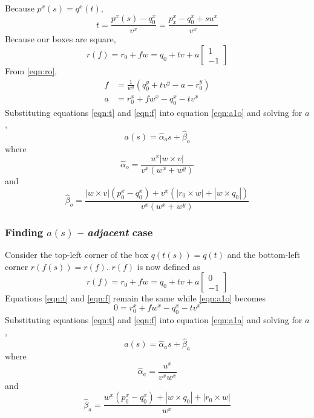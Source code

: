 \documentclass[submission]{gmp2017}
\begin{document}
Because $p^x(s)=q^x(t)$,
\begin{equation}
t = \frac{p^x(s)-q_0^x}{v^x} = \frac{p_x^x-q_0^x+su^x}{v^x} \label{eqn:t}
\end{equation}
Because our boxes are square,
\begin{equation}
r(f) = r_0+fw = q_0+tv+a\begin{bmatrix}1\\-1\end{bmatrix} \label{eqn:ro}
\end{equation}
From \eqref{eqn:ro},
\begin{align}
f &= \frac{1}{w^y}(q_0^y+tv^y-a-r_0^y) \label{eqn:f} \\
a &= r_0^x+fw^x-q_0^x-tv^x \label{eqn:a1o}
\end{align}
Substituting equations \eqref{eqn:t} and \eqref{eqn:f} into equation \eqref{eqn:a1o} and solving for $a$,
\begin{equation}
a(s) = \hat{\alpha}_o s + \hat{\beta}_o \label{eqn:ao}
\end{equation}
where
\begin{equation}
\hat{\alpha}_o = \frac{u^x|w \times v|}{v^x(w^x+w^y)}
\end{equation}
and
\begin{equation}
\hat{\beta}_o = \frac{|w \times v|(p_0^x-q_0^x) + v^x(|r_0 \times w| + |w \times q_0|)}{v^x(w^x+w^y)}
\end{equation}

\subsubsection{Finding $a(s)$ -- \textit{adjacent} case}

Consider the top-left corner of the box $q(t(s))=q(t)$ and the bottom-left corner $r(f(s))=r(f)$. $r(f)$ is now defined as
\begin{equation}
r(f) = r_0+fw = q_0+tv+a\begin{bmatrix}0\\-1\end{bmatrix} \label{eqn:ra}
\end{equation}
Equations \eqref{eqn:t} and \eqref{eqn:f} remain the same while \eqref{eqn:a1o} becomes
\begin{equation}
0 = r_0^x+fw^x-q_0^x-tv^x \label{eqn:a1a}
\end{equation}
Substituting equations \eqref{eqn:t} and \eqref{eqn:f} into equation \eqref{eqn:a1a} and solving for $a$,
\begin{equation}
a(s) = \hat{\alpha}_a s + \hat{\beta}_a \label{eqn:aa}
\end{equation}
where
\begin{equation}
\hat{\alpha}_a = \frac{u^x}{v^xw^x}
\end{equation}
and
\begin{equation}
\hat{\beta}_a = \frac{w^x(p_0^x-q_0^x)+|w \times q_0| + |r_0 \times w|}{w^x}
\end{equation}
\end{document}
